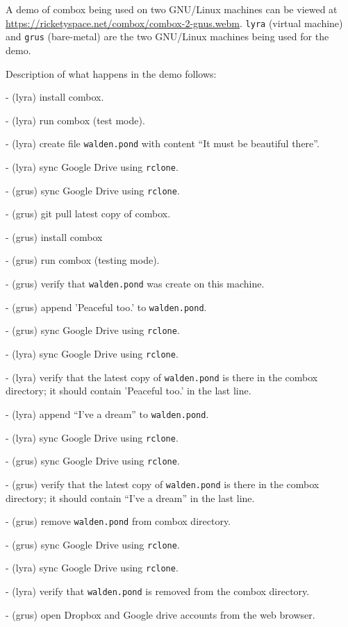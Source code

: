 A demo of combox being used on two GNU/Linux machines can be viewed at
\url{https://ricketyspace.net/combox/combox-2-gnus.webm}. \verb+lyra+ (virtual machine) and \verb+grus+ (bare-metal) are the two
GNU/Linux machines being used for the demo.

Description of what happens in the demo follows:

 - (lyra) install combox.

 - (lyra) run combox (test mode).

 - (lyra) create file \verb+walden.pond+ with content ``It must be
 beautiful there''.

 - (lyra) sync Google Drive using \verb+rclone+.

 - (grus) sync Google Drive using \verb+rclone+.

 - (grus) git pull latest copy of combox.

 - (grus) install combox 

 - (grus) run combox (testing mode).

 - (grus) verify that \verb+walden.pond+ was create on this machine.

 - (grus) append 'Peaceful too.' to \verb+walden.pond+.

 - (grus) sync Google Drive using \verb+rclone+.

 - (lyra) sync Google Drive using \verb+rclone+.

 - (lyra) verify that the latest copy of \verb+walden.pond+ is there
 in the combox directory; it should contain 'Peaceful too.' in the
 last line.

 - (lyra) append ``I've a dream'' to \verb+walden.pond+.

 - (lyra) sync Google Drive using \verb+rclone+.

 - (grus) sync Google Drive using \verb+rclone+.

 - (grus) verify that the latest copy of \verb+walden.pond+ is there
 in the combox directory; it should contain ``I've a dream'' in the
 last line.

 - (grus) remove \verb+walden.pond+ from combox directory.

 - (grus) sync Google Drive using \verb+rclone+.

 - (lyra) sync Google Drive using \verb+rclone+.

 - (lyra) verify that \verb+walden.pond+ is removed from the combox
 directory.

 - (grus) open Dropbox and Google drive accounts from the web browser.

